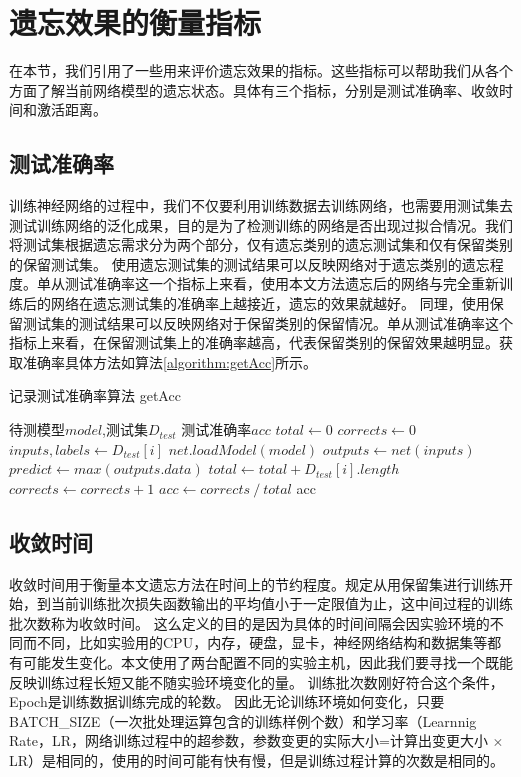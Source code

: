 \section{遗忘效果的衡量指标} \label{forget_evaluation_index}
在本节，我们引用了一些用来评价遗忘效果的指标。这些指标可以帮助我们从各个方面了解当前网络模型的遗忘状态。具体有三个指标，分别是测试准确率、收敛时间和激活距离。

\subsection{测试准确率}
训练神经网络的过程中，我们不仅要利用训练数据去训练网络，也需要用测试集去测试训练网络的泛化成果，目的是为了检测训练的网络是否出现过拟合情况。我们将测试集根据遗忘需求分为两个部分，仅有遗忘类别的遗忘测试集和仅有保留类别的保留测试集。
使用遗忘测试集的测试结果可以反映网络对于遗忘类别的遗忘程度。单从测试准确率这一个指标上来看，使用本文方法遗忘后的网络与完全重新训练后的网络在遗忘测试集的准确率上越接近，遗忘的效果就越好。
同理，使用保留测试集的测试结果可以反映网络对于保留类别的保留情况。单从测试准确率这个指标上来看，在保留测试集上的准确率越高，代表保留类别的保留效果越明显。获取准确率具体方法如算法\ref{algorithm:getAcc}所示。
\begin{algorithm}
	\renewcommand{\algorithmicrequire}{\textbf{Input:}}
	\renewcommand{\algorithmicensure}{\textbf{Output:}}
	\caption{记录测试准确率算法  getAcc}
	\label{algorithm:getAcc}
	\begin{algorithmic}[1]
        \REQUIRE 待测模型$model$,测试集$D_{test}$
        \ENSURE  测试准确率$acc$
        \STATE $total \gets 0$
        \STATE $corrects \gets 0$
            \STATE $inputs, labels \gets D_{test}[i]$
            \STATE $net.loadModel(model)$
            \STATE $outputs \gets net(inputs)$
            \STATE $predict \gets max(outputs.data)$
            \STATE $total \gets total + D_{test}[i].length$
                    \STATE $corrects \gets corrects + 1$
                \ENDIF
            \ENDFOR
        \ENDFOR
        \STATE $acc \gets corrects {\ } / {\ } total$
        \RETURN acc
	\end{algorithmic}  
\end{algorithm}

\subsection{收敛时间}
收敛时间用于衡量本文遗忘方法在时间上的节约程度。规定从用保留集进行训练开始，到当前训练批次损失函数输出的平均值小于一定限值为止，这中间过程的训练批次数称为收敛时间。
这么定义的目的是因为具体的时间间隔会因实验环境的不同而不同，比如实验用的CPU，内存，硬盘，显卡，神经网络结构和数据集等都有可能发生变化。本文使用了两台配置不同的实验主机，因此我们要寻找一个既能反映训练过程长短又能不随实验环境变化的量。
训练批次数刚好符合这个条件，Epoch是训练数据训练完成的轮数。
因此无论训练环境如何变化，只要BATCH\_SIZE（一次批处理运算包含的训练样例个数）和学习率（Learnnig Rate，LR，网络训练过程中的超参数，参数变更的实际大小=计算出变更大小 $\times$ LR）是相同的，使用的时间可能有快有慢，但是训练过程计算的次数是相同的。

